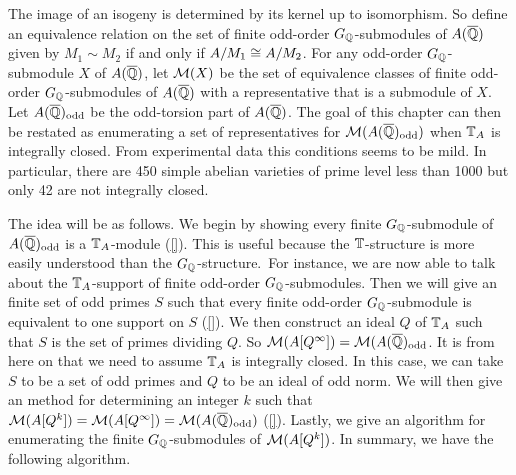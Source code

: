 \documentclass[11pt, proquest]{uwthesis}
\begin{document}
The image of an isogeny is determined by its kernel up to isomorphism. So
define an equivalence relation on the set of finite odd-order
$G_{\mathbb{Q}}$-submodules of $A(\overline{\mathbb{Q}})$ given by $M_1\sim M_2$ if and only if
$A/M_1\cong A/M_2$. For any odd-order $G_{\mathbb{Q}}$-submodule $X$ of $A(\overline{\mathbb{Q}})$, let
$\mathcal{M}(X)$ be the set of equivalence classes of finite odd-order
$G_{\mathbb{Q}}$-submodules of $A(\overline{\mathbb{Q}})$ with a representative that is a submodule of
$X$. Let $A(\overline{\mathbb{Q}})_{\mathrm{odd}}$ be the odd-torsion part of $A(\overline{\mathbb{Q}})$. The goal of
this chapter can then be restated as enumerating a set of representatives for
$\mathcal{M}(A(\overline{\mathbb{Q}})_{\mathrm{odd}})$ when $\mathbb{T}_A$ is integrally closed. From experimental data
this conditions seems to be mild. In particular, there are 450 simple abelian
varieties of prime level less than 1000 but only 42 are not integrally closed.

The idea will be as follows. We begin by showing every finite $G_{\mathbb{Q}}$-submodule
of $A(\overline{\mathbb{Q}})_{\mathrm{odd}}$ is a $\mathbb{T}_A$-module (\ref{}). This is useful because the
$\mathbb{T}$-structure is more easily understood than the $G_{\mathbb{Q}}$-structure.\ For
instance, we are now able to talk about the $\mathbb{T}_A$-support of finite odd-order
$G_{\mathbb{Q}}$-submodules. Then we will give an finite set of odd primes $S$ such that
every finite odd-order $G_{\mathbb{Q}}$-submodule is equivalent to one support on $S$
(\ref{}). We then construct an ideal $Q$ of $\mathbb{T}_A$ such that $S$ is the set of
primes dividing $Q$. So $\mathcal{M}(A[Q^\infty])=\mathcal{M}(A(\overline{\mathbb{Q}})_{\mathrm{odd}}$. It is from here on
that we need to assume $\mathbb{T}_A$ is integrally closed. In this case, we can take
$S$ to be a set of odd primes and $Q$ to be an ideal of odd norm. We will then
give an method for determining an integer $k$ such that
$\mathcal{M}(A[Q^k])=\mathcal{M}(A[Q^\infty])=\mathcal{M}(A(\overline{\mathbb{Q}})_{\mathrm{odd}})$ (\ref{}). Lastly, we give an
algorithm for enumerating the finite $G_{\mathbb{Q}}$-submodules of $\mathcal{M}(A[Q^k])$. In
summary, we have the following algorithm. 
\end{document}
